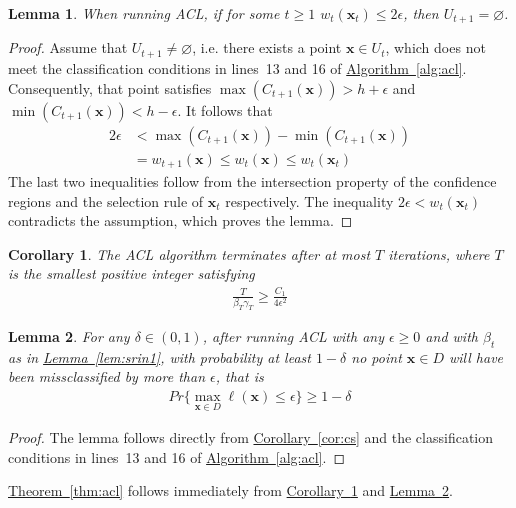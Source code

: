 \documentclass{article}
\def\*#1{\bm{#1}}
\newcommand{\algoref}[1]{\hyperref[#1]{\mbox{Algorithm~\ref*{#1}}}}
\newcommand{\theoremref}[1]{\hyperref[#1]{\mbox{Theorem~\ref*{#1}}}}
\newcommand{\lemmaref}[1]{\hyperref[#1]{\mbox{Lemma~\ref*{#1}}}}
\newcommand{\corref}[1]{\hyperref[#1]{\mbox{Corollary~\ref*{#1}}}}
\newtheorem{lemma}{Lemma}
\newtheorem{cor}{Corollary}
\begin{document}
\begin{lemma}
When running ACL, if for some $t \geq 1$ $w_t(\*x_t) \leq 2\epsilon$,
then $U_{t+1} = \varnothing$.
\end{lemma}
\begin{proof}
Assume that $U_{t+1} \neq \varnothing$, i.e. there exists a point
$\*x \in U_t$, which does not meet the classification conditions in
lines~13 and 16 of \algoref{alg:acl}. Consequently, that point
satisfies $\max(C_{t+1}(\*x)) > h + \epsilon$ and
$\min(C_{t+1}(\*x)) < h - \epsilon$. It follows that
\begin{align*}
2\epsilon &< \max(C_{t+1}(\*x)) - \min(C_{t+1}(\*x))\\
&= w_{t+1}(\*x) \leq w_t(\*x) \leq w_t(\*x_t)
\end{align*}
The last two inequalities follow from the intersection property of
the confidence regions and the selection rule of $\*x_t$ respectively.
The inequality $2\epsilon < w_t(\*x_t)$ contradicts the assumption, which
proves the lemma.
\end{proof}

\begin{cor}
\label{cor:iter}
The ACL algorithm terminates after at most $T$ iterations, where $T$
is the smallest positive integer satisfying
\begin{align*}
\frac{T}{\beta_T \gamma_T} \geq \frac{C_1}{4\epsilon^2}
\end{align*}
\end{cor}

\begin{lemma}
\label{lem:prob}
For any $\delta \in (0, 1)$, after running ACL with any $\epsilon \geq 0$
and with $\beta_t$ as in \lemmaref{lem:srin1}, with probability at least
$1-\delta$ no point $\*x \in D$ will have been missclassified by more
than $\epsilon$, that is
\begin{align*}
Pr\{\max_{\*x\in D}\ell(\*x) \leq \epsilon\} \geq 1 - \delta
\end{align*}
\end{lemma}
\begin{proof}
The lemma follows directly from \corref{cor:cs} and the classification
conditions in lines~13 and 16 of \algoref{alg:acl}.
\end{proof}

\theoremref{thm:acl} follows immediately from \corref{cor:iter}
and \lemmaref{lem:prob}.




\end{document}
